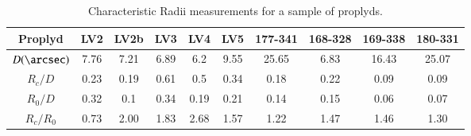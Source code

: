  \begin{table*}
\begin{tabular}{c|ccccccccc}\hline
Proplyd & LV2 & LV2b & LV3 & LV4  & LV5 & 177-341 & 168-328 & 169-338 & 180-331\\\hline
$D (\arcsec)$ &7.76 & 7.21 &6.89 & 6.2 & 9.55 & 25.65 & 6.83 & 16.43 & 25.07 \\
$R_c/D$  & 0.23  & 0.19& 0.61  & 0.5  & 0.34  & 0.18  & 0.22 & 0.09 & 0.09\\
$R_0/D$  & 0.32 & 0.1 & 0.34 & 0.19 & 0.21 & 0.14 & 0.15 & 0.06 & 0.07\\
$R_c/R_0$ & 0.73 & 2.00 & 1.83 & 2.68  & 1.57 & 1.22 & 1.47 & 1.46 & 1.30  
\end{tabular}
\caption{Characteristic Radii measurements for a sample of proplyds. %
} 

\label{tab:proplyds}
\end{table*}

